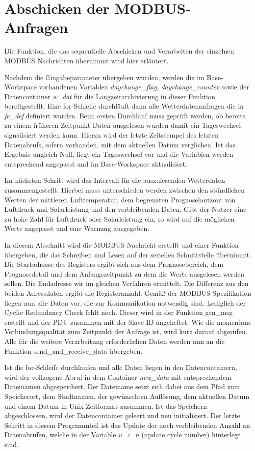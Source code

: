 \section{Abschicken der MODBUS-Anfragen}

Die Funktion, die das sequentielle Abschicken und Verarbeiten der einzelnen MODBUS Nachrichten übernimmt wird hier erläutert.

Nachdem die Eingabeparameter übergeben wurden, werden die im Base-Workspace vorhandenen Variablen \textit{daychange\_flag}, \textit{daychange\_counter}  sowie der Datencontainer \textit{w\_dat} für die Langzeitarchivierung in dieser Funktion bereitgestellt. Eine for-Schleife durchläuft dann alle Wetterdatenanfragen die in \textit{fc\_def} definiert wurden. Beim ersten Durchlauf muss geprüft werden, ob bereits zu einem früheren Zeitpunkt Daten ausgelesen wurden damit ein Tageswechsel signalisiert werden kann. Hierzu wird der letzte Zeitstempel des letzten Datenabrufs, sofern vorhanden, mit dem aktuellen Datum verglichen. Ist das Ergebnis ungleich Null, liegt ein Tageswechsel vor und die Variablen werden entsprechend angepasst und im Base-Workspace aktualisiert.

Im nächsten Schritt wird das Intervall für die auszulesenden Wetterdaten zusammengestellt. Hierbei muss unterschieden werden zwischen den stündlichen Werten der mittleren Lufttemperatur, dem begrenzten Prognosehorizont von Luftdruck und Solarleistung und den verbleibenden Daten. Gibt der Nutzer eine zu hohe Zahl für Luftdruck oder Solarleistung ein, so wird auf die möglichen Werte angepasst und eine Warnung ausgegeben.

In diesem Abschnitt wird die MODBUS Nachricht erstellt und einer Funktion übergeben, die das Schreiben und Lesen auf der seriellen Schnittstelle übernimmt. Die Startadresse des Registers ergibt sich aus dem Prognosebereich, dem Prognosedetail und dem Anfangszeitpunkt zu dem die Werte ausgelesen werden sollen. Die Endadresse wir im gleichen Verfahren ermittelt. Die Differenz aus den beiden Adressdaten ergibt die Registeranzahl. Gemäß der MODBUS Spezifikation liegen nun alle Daten vor, die zur Kommunikation notwendig sind. Lediglich der Cyclic Redundancy Check fehlt noch. Dieser wird in der Funktion \textsf{gen\_msg} erstellt und der PDU zusammen mit der Slave-ID angeheftet. Wie die momentane Verbindungsqualität zum Zeitpunkt der Anfrage ist, wird kurz darauf abgerufen. Alle für die weitere Verarbeitung erforderlichen Daten werden nun an die Funktion \textsf{send\_and\_receive\_data} übergeben. 

Ist die for-Schleife durchlaufen und alle Daten liegen in den Datencontainern, wird der vollzogene Abruf in dem Container \textit{new\_data} mit entsprechendem Dateinamen abgespeichert. Der Dateiname setzt sich dabei aus dem Pfad zum Speicherort, dem Stadtnamen, der gewünschten Auflösung, dem aktuellen Datum und einem Datum in Unix Zeitformat zusammen. Ist das Speichern abgeschlossen, wird der Datencontainer geleert und neu initialisiert. Der letzte Schritt in diesem Programmteil ist das Update der noch verbleibenden Anzahl an Datenabrufen, welche in der Variable \textit{u\_c\_n} (update cycle number) hinterlegt sind.
